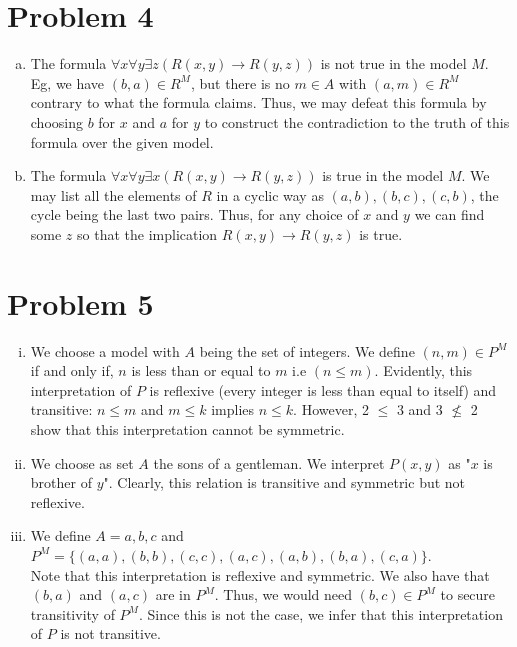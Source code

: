 \documentclass[11pt,leqno,fleqn]{article}
\begin{document}
\newpage
\section{Problem 4}

\begin{enumerate}[(a)]
\item
The formula $\forall x \forall y \exists z (R(x,y) \to R(y,z))$ is not true in the model $M$. Eg, we have $(b,a) \in R^M$, but there is no $m \in A$ with $(a,m) \in R^M$ contrary to what the formula claims. Thus, we may defeat this formula by choosing $b$ for $x$ and $a$ for $y$ to construct the contradiction to the truth of this formula over the given model.

\item
The formula $\forall x \forall y \exists x(R(x,y) \to R(y,z))$ is true in the model $M$. We may list all the elements of $R$ in a cyclic way as $(a,b), (b,c), (c,b)$, the cycle being the last two pairs. Thus, for any choice of $x$ and $y$ we can find some $z$ so that the implication $R(x,y) \to R(y,z)$ is true.

\end{enumerate}

\section{Problem 5}

\begin{enumerate}[(i)]
\item
We choose a model with $A$ being the set of integers. We define $(n,m) \in P^M$ if and only if, $n$ is less than or equal to $m$ i.e $(n \leq m)$. Evidently, this interpretation of $P$ is reflexive (every integer is less than equal to itself) and transitive: $n \leq m$ and $m \leq k$ implies $n \leq k$. However, 2 $\leq$ 3 and 3 $\nleq$ 2 show that this interpretation cannot be symmetric.

\item
We choose as set $A$ the sons of a gentleman. We interpret $P(x,y)$ as "$x$ is brother of $y$". Clearly, this relation is transitive and symmetric but not reflexive.

\item
We define $A = {a,b,c}$ and $P^M = \{(a,a),(b,b),(c,c),(a,c),(a,b),(b,a),(c,a)\}$. \\
Note that this interpretation is reflexive and symmetric. We also have that $(b,a)$ and $(a,c)$ are in $P^M$. Thus, we would need $(b,c) \in P^M$ to secure transitivity of $P^M$. Since this is not the case, we infer that this interpretation of $P$ is not transitive.
\end{enumerate}
\end{document}

